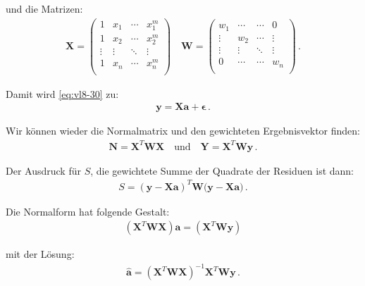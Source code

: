 und die Matrizen:
\begin{align}
\boldsymbol{X} = 
\begin{pmatrix}
1      & x_1    & \cdots & x_1^m  \\
1      & x_2    & \cdots & x_2^m  \\
\vdots & \vdots & \ddots & \vdots \\
1      & x_n    & \cdots & x_n^m  \\
\end{pmatrix}\quad
\boldsymbol{W} = 
\begin{pmatrix}
w_1    & \cdots & \cdots & 0      \\
\vdots & w_2    & \cdots & \vdots \\
\vdots & \vdots & \ddots & \vdots \\
0      & \cdots & \cdots & w_n    \\
\end{pmatrix}\,.
\label{eq:vl8-33}
\end{align}

Damit wird \cref{eq:vl8-30} zu:
\begin{align}
\boldsymbol{y} = \boldsymbol{X} \boldsymbol{a} + \boldsymbol{\epsilon}\,.
\label{eq:vl8-34}
\end{align}

Wir k\"onnen wieder die Normalmatrix und den gewichteten Ergebnisvektor finden:
\begin{align}
\boldsymbol{N} = \boldsymbol{X}^T \boldsymbol{W X} \quad \text{und} \quad \boldsymbol{Y} = \boldsymbol{X}^T \boldsymbol{W y}\,.
\label{eq:vl8-35}
\end{align}

Der Ausdruck f\"ur $S$, die gewichtete Summe der Quadrate der Residuen ist dann:
\begin{align}
S = ( \boldsymbol{y} - \boldsymbol{ X a } )^T \boldsymbol{W}( \boldsymbol{y} - \boldsymbol{X a )}\,.
\label{eq:vl8-36}
\end{align}

Die Normalform hat folgende Gestalt:
\begin{align}
( \boldsymbol{X}^T \boldsymbol{WX} ) \boldsymbol{a} = ( \boldsymbol{X}^T \boldsymbol{Wy} )
\label{eq:vl8-37}
\end{align}

mit der L\"osung:
\begin{align}
\boldsymbol{\hat{a}} = ( \boldsymbol{X}^T \boldsymbol{WX} )^{-1} \boldsymbol{X}^T \boldsymbol{Wy}\,.
\label{eq:vl8-38}
\end{align}

